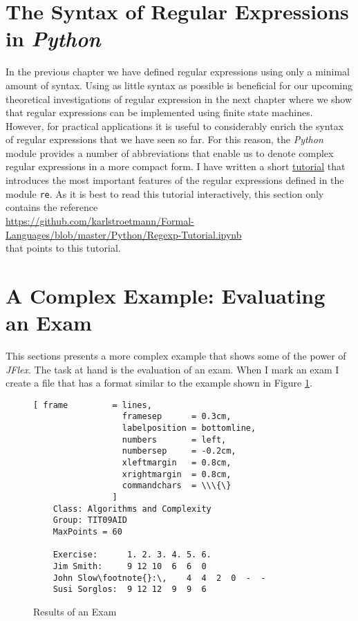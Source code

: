 \section{The Syntax of Regular Expressions in \textsl{Python}}
In the previous chapter we have defined regular expressions using only a minimal amount of syntax. 
Using as little syntax as possible is beneficial for our upcoming theoretical investigations of
regular expression in the next chapter where we show that regular expressions can be implemented
using finite state machines.  However, for practical applications it is useful to considerably
enrich the syntax of regular expressions that we have seen so far.
For this reason, the \textsl{Python} module  provides a number of abbreviations that enable us to denote
complex regular expressions in a more compact form.  I have written a short 
\href{https://github.com/karlstroetmann/Formal-Languages/blob/master/Python/Regexp-Tutorial.ipynb}{tutorial}
that introduces the most important features of the regular expressions defined in the module \texttt{re}.
As it is best to read this tutorial interactively, this section only contains the reference
\\[0.2cm]
\hspace*{1.3cm}
\href{https://github.com/karlstroetmann/Formal-Languages/blob/master/Python/Regexp-Tutorial.ipynb}{https://github.com/karlstroetmann/Formal-Languages/blob/master/Python/Regexp-Tutorial.ipynb}
\\[0.2cm]
that points to this tutorial.

\section{A Complex Example: Evaluating an Exam}
This sections presents a more complex example that shows some of the power of \textsl{JFlex}.  The
task at hand is the evaluation of an exam.  When I mark an exam I create a file that has a format
similar to the example shown in Figure \ref{fig:result.txt}. 

\begin{figure}[!h]
\centering
\begin{Verbatim}[ frame         = lines, 
                  framesep      = 0.3cm, 
                  labelposition = bottomline,
                  numbers       = left,
                  numbersep     = -0.2cm,
                  xleftmargin   = 0.8cm,
                  xrightmargin  = 0.8cm,
                  commandchars  = \\\{\}
                ]
    Class: Algorithms and Complexity
    Group: TIT09AID
    MaxPoints = 60
   
    Exercise:      1. 2. 3. 4. 5. 6.
    Jim Smith:     9 12 10  6  6  0
    John Slow\footnote{}:\,    4  4  2  0  -  -
    Susi Sorglos:  9 12 12  9  9  6
\end{Verbatim}
\vspace*{-0.3cm}
\caption{Results of an Exam}
\label{fig:result.txt}
\end{figure}

